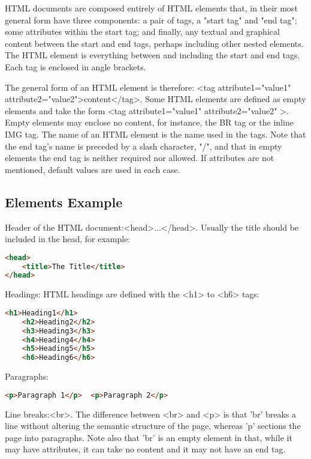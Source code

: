 HTML documents are composed entirely of HTML elements that, in their most general form have three components: a pair of tags, a "start tag" and "end tag"; some attributes within the start tag; and finally, any textual and graphical content between the start and end tags, perhaps including other nested elements. The HTML element is everything between and including the start and end tags. Each tag is enclosed in angle brackets.

The general form of an HTML element is therefore: <tag attribute1="value1" attribute2="value2">content</tag>. Some HTML elements are defined as empty elements and take the form <tag attribute1="value1" attribute2="value2" >. Empty elements may enclose no content, for instance, the BR tag or the inline IMG tag. The name of an HTML element is the name used in the tags. Note that the end tag's name is preceded by a slash character, "/", and that in empty elements the end tag is neither required nor allowed. If attributes are not mentioned, default values are used in each case.

\subsection{Elements Example}

Header of the HTML document:<head>...</head>. Usually the title should be included in the head, for example:


\begin{lstlisting}[language=HTML]
<head>
	<title>The Title</title>
</head>
\end{lstlisting}

Headings: HTML headings are defined with the <h1> to <h6> tags:

\begin{lstlisting}[language=HTML]
	<h1>Heading1</h1>
	<h2>Heading2</h2>
	<h3>Heading3</h3>
	<h4>Heading4</h4>
	<h5>Heading5</h5>
	<h6>Heading6</h6>
\end{lstlisting}



Paragraphs:

\begin{lstlisting}[language=HTML]
	<p>Paragraph 1</p>  <p>Paragraph 2</p>
\end{lstlisting}

Line breaks:<br>. The difference between <br> and <p> is that 'br' breaks a line without altering the semantic structure of the page, whereas 'p' sections the page into paragraphs. Note also that 'br' is an empty element in that, while it may have attributes, it can take no content and it may not have an end tag.


